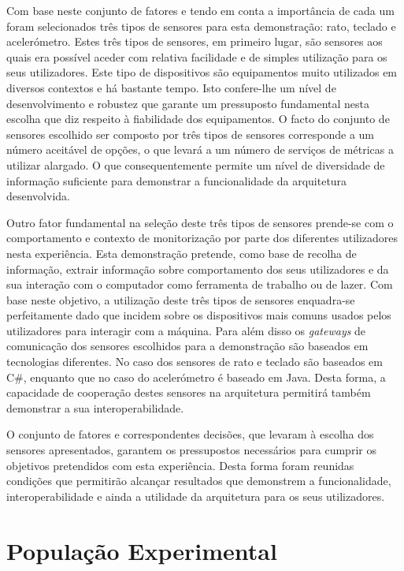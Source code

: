 Com base neste conjunto de fatores e tendo em conta a importância de cada um foram selecionados três tipos de sensores para esta demonstração: rato, teclado e acelerómetro. Estes três tipos de sensores, em primeiro lugar, são sensores aos quais era possível aceder com relativa facilidade e de simples utilização para os seus utilizadores. Este tipo de dispositivos são equipamentos muito utilizados em diversos contextos e há bastante tempo. Isto confere-lhe um nível de desenvolvimento e robustez que garante um pressuposto fundamental nesta escolha que diz respeito à fiabilidade dos equipamentos. O facto do conjunto de sensores escolhido ser composto por três tipos de sensores corresponde a um número aceitável de opções, o que levará a um número de serviços de métricas a utilizar alargado. O que consequentemente permite um nível de diversidade de informação suficiente para demonstrar a funcionalidade da arquitetura desenvolvida.

Outro fator fundamental na seleção deste três tipos de sensores prende-se com o comportamento e contexto de monitorização por parte dos diferentes utilizadores nesta experiência. Esta demonstração pretende, como base de recolha de informação, extrair informação sobre comportamento dos seus utilizadores e da sua interação com o computador como ferramenta de trabalho ou de lazer. Com base neste objetivo, a utilização deste três tipos de sensores enquadra-se perfeitamente dado que incidem sobre os dispositivos mais comuns usados pelos utilizadores para interagir com a máquina. Para além disso os \textit{gateways} de comunicação dos sensores escolhidos para a demonstração são baseados em tecnologias diferentes. No caso dos sensores de rato e teclado são baseados em C\#, enquanto que no caso do acelerómetro é baseado em Java. Desta forma, a capacidade de cooperação destes sensores na arquitetura permitirá também demonstrar a sua interoperabilidade.

O conjunto de fatores e correspondentes decisões, que levaram à escolha dos sensores apresentados, garantem os pressupostos necessários para cumprir os objetivos pretendidos com esta experiência. Desta forma foram reunidas condições que permitirão alcançar resultados que demonstrem a funcionalidade, interoperabilidade e ainda a utilidade da arquitetura para os seus utilizadores.

\section{População Experimental}

